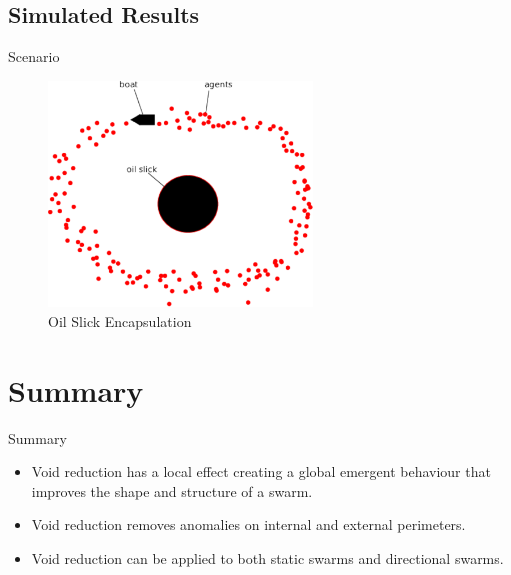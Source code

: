\documentclass{beamer}
\begin{document}
\subsection{Simulated Results}
\begin{frame}{Scenario}
  \begin{center}
    \begin{figure}
      \begin{center}
        \includegraphics[width=7cm]{OilSlick.pdf}
      \end{center}
      \caption{Oil Slick Encapsulation}
    \end{figure}
  \end{center}
\end{frame}  


\section*{Summary}

\begin{frame}{Summary}
  \begin{itemize}
  \item
    \alert{Void reduction} has a local effect creating a global emergent behaviour that improves the shape and structure of a swarm.
  \item
    \alert{Void reduction} removes anomalies on internal and external perimeters.
  \item
    \alert{Void reduction} can be applied to both static swarms and directional swarms.
  \end{itemize}
\end{frame}
\end{document}
